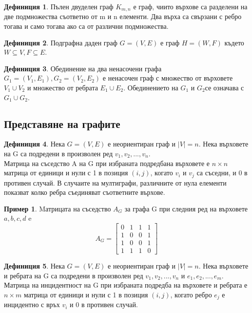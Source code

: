 \documentclass[fleqn, 12pt]{article}
\theoremstyle{definition}
\newtheorem{example}{Пример}[subsection]
\newtheorem{definition}{Дефиниция}[subsection]
\begin{document}
\begin{definition}
Пълен двуделен граф $K_{m,n}$ е граф, чиито върхове са разделени на две подмножества съответно от m и n елементи. Два върха са свързани с ребро тогава и само тогава ако са от различни подмножества.
\end{definition}
\begin{definition}
Подграфна даден граф $G = (V, E)$ е граф $H = (W, F)$ където $W \subseteq V, F \subseteq E$.
\end{definition}
\begin{definition}
Обединение на два ненасочени графа $G_1= (V_1, E_1), G_2= (V_2, E_2)$ е ненасочен граф с множество от върховете $V_1\cup V_2 $ и множество от ребрата $E_1 \cup E_2$. Обединението на $G_1$ и $G_2$се означава с $G_1\cup G_2$.
\end{definition}
\subsection{Представяне на графите}
\begin{definition}
Нека $G = (V, E)$ е неориентиран граф и $\vert V \vert = n$. Нека върховете на G са подредени в произволен ред $v_1, v_2, ..., v_n$. \\
Матрица на съседство A  на G при избраната подредбана върховете е $n \times n$ матрица от единици и нули с 1 в позиция $(i, j)$, когато $v_i$ и $v_j$ са съседни, и 0 в противен случай. В случаите на мултиграфи, различните от нула елементи показват колко ребра съединяват съответните върхове.
\end{definition}
\begin{example}
Mатрицата на съседство $A_G$ за графа G при следния ред на върховете $a, b, c, d$ e \\
$$A_G = 
\begin{bmatrix}
0 & 1 & 1 & 1\\
1 & 0 & 0 & 1\\
1 & 0 & 0 & 1 \\
1 & 1 & 1 & 0
\end{bmatrix}
$$
\end{example}

\begin{definition}
Нека $G = (V, E)$ е неориентиран граф и $\vert V \vert = n$. Нека върховете и ребрата на G са подредени в произволен ред $v_1, v_2, ..., v_n$ и $e_1,e_2, ..., e_m$. \\
Матрица на инцидентност на G при избраната подредба на върховете и ребрата е $n \times m$ матрица от единици и нули с 1 в позиция $(i, j)$, когато ребро $e_j$ е инцидентно с връх $v_i$ и 0 в противен случай.
\end{definition}
\end{document}
